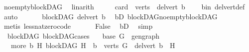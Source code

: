 \begin{isabellebody}
\ no{\isacharunderscore}{\kern0pt}empty{\isacharunderscore}{\kern0pt}blockDAG\ \isamarkupfalse%
\ linarith\isanewline
\ \ \isamarkupfalse%
\ \isamarkupfalse%
\ {\isachardoublequoteopen}card\ {\isacharparenleft}{\kern0pt}\ verts\ {\isacharparenleft}{\kern0pt}\ del{\isacharunderscore}{\kern0pt}vert\ b{\isacharparenright}{\kern0pt}{\isacharparenright}{\kern0pt}\ {\isacharequal}{\kern0pt}\ {}{\isachardoublequoteclose}\ \isamarkupfalse%
\ b{\isacharunderscore}{\kern0pt}in\ del{\isacharunderscore}{\kern0pt}vert{\isacharunderscore}{\kern0pt}def\ \isamarkupfalse%
\ auto\isanewline
\ \ \isamarkupfalse%
\ \isamarkupfalse%
\ {\isachardoublequoteopen}{\isasymnot}\ blockDAG\ {\isacharparenleft}{\kern0pt}del{\isacharunderscore}{\kern0pt}vert\ b{\isacharparenright}{\kern0pt}{\isachardoublequoteclose}\ \isamarkupfalse%
\ bD\ blockDAG{\isachardot}{\kern0pt}no{\isacharunderscore}{\kern0pt}empty{\isacharunderscore}{\kern0pt}blockDAG\isanewline
\ \ \ \ \isamarkupfalse%
\ {\isacharparenleft}{\kern0pt}metis\ less{\isacharunderscore}{\kern0pt}nat{\isacharunderscore}{\kern0pt}zero{\isacharunderscore}{\kern0pt}code{\isacharparenright}{\kern0pt}\ \isanewline
\ \ \isamarkupfalse%
\ \isamarkupfalse%
\ {\isachardoublequoteopen}False{\isachardoublequoteclose}\ \isamarkupfalse%
\ bD\ \isamarkupfalse%
\ simp\isanewline
\ \ \isamarkupfalse%
\isanewline
{}\isamarkupfalse%
%
\endisatagproof
{\isafoldproof}%
%
\isadelimproof
\isanewline
%
\endisadelimproof
\isanewline
{}\isamarkupfalse%
\ {\isacharparenleft}{\kern0pt}\ blockDAG{\isacharparenright}{\kern0pt}\ blockDAG{\isacharunderscore}{\kern0pt}cases{\isacharcolon}{\kern0pt}\isanewline
\ \ \ {\isacharparenleft}{\kern0pt}base{\isacharparenright}{\kern0pt}\ {\isachardoublequoteopen}{\isacharparenleft}{\kern0pt}G\ {\isacharequal}{\kern0pt}\ gen{\isacharunderscore}{\kern0pt}graph{\isacharparenright}{\kern0pt}{\isachardoublequoteclose}\isanewline
\ \ {\isacharbar}{\kern0pt}\ {\isacharparenleft}{\kern0pt}more{\isacharparenright}{\kern0pt}\ {\isachardoublequoteopen}{\isacharparenleft}{\kern0pt}{\isasymexists}b\ H{\isachardot}{\kern0pt}\ {\isacharparenleft}{\kern0pt}blockDAG\ H\ {\isasymand}\ b\ {\isasymin}\ verts\ G\ {\isasymand}\ del{\isacharunderscore}{\kern0pt}vert\ b\ {\isacharequal}{\kern0pt}\ H{\isacharparenright}{\kern0pt}{\isacharparenright}{\kern0pt}{\isachardoublequoteclose}\isanewline

\end{isabellebody}
